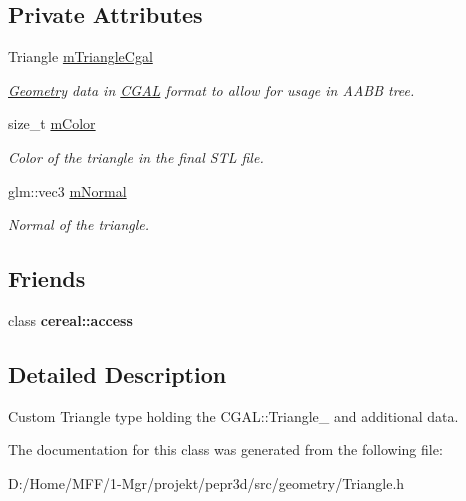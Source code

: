 \subsection*{Private Attributes}
\begin{DoxyCompactItemize}
\item 
\mbox{\label{classpepr3d_1_1_data_triangle_a772bbc9154b44aaeb7d62bd0842ed171}} 
Triangle \mbox{\hyperlink{classpepr3d_1_1_data_triangle_a772bbc9154b44aaeb7d62bd0842ed171}{m\+Triangle\+Cgal}}
\begin{DoxyCompactList}\small\item\em \mbox{\hyperlink{classpepr3d_1_1_geometry}{Geometry}} data in \mbox{\hyperlink{namespace_c_g_a_l}{C\+G\+AL}} format to allow for usage in A\+A\+BB tree. \end{DoxyCompactList}\item 
\mbox{\label{classpepr3d_1_1_data_triangle_a2fe0967cc85bdb8f04639acbe3547f51}} 
size\+\_\+t \mbox{\hyperlink{classpepr3d_1_1_data_triangle_a2fe0967cc85bdb8f04639acbe3547f51}{m\+Color}}
\begin{DoxyCompactList}\small\item\em Color of the triangle in the final S\+TL file. \end{DoxyCompactList}\item 
\mbox{\label{classpepr3d_1_1_data_triangle_a86e289f4e1978d6e71240bf73ef8904e}} 
glm\+::vec3 \mbox{\hyperlink{classpepr3d_1_1_data_triangle_a86e289f4e1978d6e71240bf73ef8904e}{m\+Normal}}
\begin{DoxyCompactList}\small\item\em Normal of the triangle. \end{DoxyCompactList}\end{DoxyCompactItemize}
\subsection*{Friends}
\begin{DoxyCompactItemize}
\item 
\mbox{\label{classpepr3d_1_1_data_triangle_ab2f44cbb59a08132f4c843e5225bba0e}} 
class {\bfseries cereal\+::access}
\end{DoxyCompactItemize}


\subsection{Detailed Description}
Custom Triangle type holding the C\+G\+A\+L\+::\+Triangle\+\_ and additional data. 

The documentation for this class was generated from the following file\+:\begin{DoxyCompactItemize}
\item 
D\+:/\+Home/\+M\+F\+F/1-\/\+Mgr/projekt/pepr3d/src/geometry/Triangle.\+h\end{DoxyCompactItemize}
